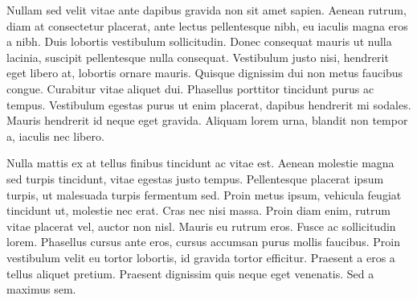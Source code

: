 Nullam sed velit vitae ante dapibus gravida non sit amet sapien. Aenean rutrum, diam at consectetur placerat, ante lectus pellentesque nibh, eu iaculis magna eros a nibh. Duis lobortis vestibulum sollicitudin. Donec consequat mauris ut nulla lacinia, suscipit pellentesque nulla consequat. Vestibulum justo nisi, hendrerit eget libero at, lobortis ornare mauris. Quisque dignissim dui non metus faucibus congue. Curabitur vitae aliquet dui. Phasellus porttitor tincidunt purus ac tempus. Vestibulum egestas purus ut enim placerat, dapibus hendrerit mi sodales. Mauris hendrerit id neque eget gravida. Aliquam lorem urna, blandit non tempor a, iaculis nec libero.

Nulla mattis ex at tellus finibus tincidunt ac vitae est. Aenean molestie magna sed turpis tincidunt, vitae egestas justo tempus. Pellentesque placerat ipsum turpis, ut malesuada turpis fermentum sed. Proin metus ipsum, vehicula feugiat tincidunt ut, molestie nec erat. Cras nec nisi massa. Proin diam enim, rutrum vitae placerat vel, auctor non nisl. Mauris eu rutrum eros. Fusce ac sollicitudin lorem. Phasellus cursus ante eros, cursus accumsan purus mollis faucibus. Proin vestibulum velit eu tortor lobortis, id gravida tortor efficitur. Praesent a eros a tellus aliquet pretium. Praesent dignissim quis neque eget venenatis. Sed a maximus sem.
